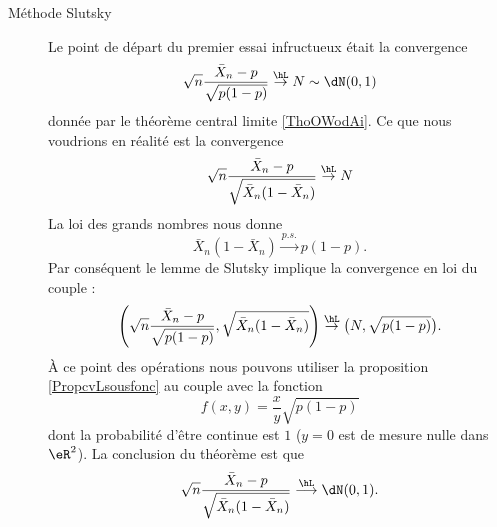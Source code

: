 \begin{description}

    \item[Méthode Slutsky]

        Le point de départ du premier essai infructueux était la convergence
        \begin{equation}
            \sqrt{n}\frac{ \bar X_n-p }{ \sqrt{p(1-p)} }\stackrel{\hL}{\to}N\sim\dN(0,1)
        \end{equation}
        donnée par le théorème central limite \ref{ThoOWodAi}. Ce que nous voudrions en réalité est la convergence
        \begin{equation}
            \sqrt{n}\frac{ \bar X_n-p }{ \sqrt{  \bar X_n(1-\bar X_n) } }\stackrel{\hL}{\to}N
        \end{equation}
        La loi des grands nombres nous donne
        \begin{equation}
            \bar X_n(1-\bar X_n)\stackrel{p.s.}{\longrightarrow}p(1-p).
        \end{equation}
        Par conséquent le lemme de Slutsky implique la convergence en loi du couple :
        \begin{equation}    \label{EqGJxxjqs}
            \left( \sqrt{n}\frac{ \bar X_n-p }{ \sqrt{p(1-p)} },\sqrt{\bar X_n(1-\bar X_n)} \right)\stackrel{\hL}{\to}\big( N,\sqrt{p(1-p)} \big).
        \end{equation}
        À ce point des opérations nous pouvons utiliser la proposition \ref{PropcvLsousfonc} au couple avec la fonction
        \begin{equation}
            f(x,y)=\frac{ x }{ y }\sqrt{p(1-p)}
        \end{equation}
        dont la probabilité d'être continue est \( 1\) (\( y=0\) est de mesure nulle dans \( \eR^2\)). La conclusion du théorème est que
        \begin{equation}
            \sqrt{n}\frac{ \bar X_n-p }{ \sqrt{\bar X_n(1-\bar X_n)} }\stackrel{\hL}{\longrightarrow}\dN(0,1).
        \end{equation}
        

\end{description}
